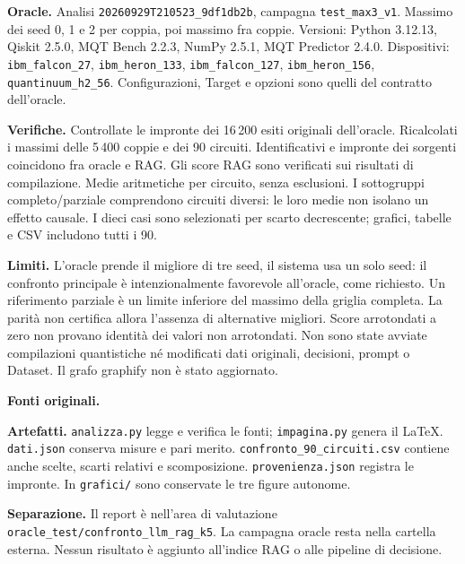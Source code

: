 \documentclass[10pt,a4paper,landscape]{article}
\begin{document}
\textbf{Oracle.} Analisi \texttt{20260929T210523\_9df1db2b}, campagna \texttt{test\_max3\_v1}.
Massimo dei seed 0, 1 e 2 per coppia, poi massimo fra coppie.
Versioni: Python 3.12.13, Qiskit 2.5.0, MQT Bench 2.2.3, NumPy 2.5.1, MQT Predictor 2.4.0.
Dispositivi: \texttt{ibm\_falcon\_27}, \texttt{ibm\_heron\_133}, \texttt{ibm\_falcon\_127},
\texttt{ibm\_heron\_156}, \texttt{quantinuum\_h2\_56}.
Configurazioni, Target e opzioni sono quelli del contratto dell'oracle.

\textbf{Verifiche.}
Controllate le impronte dei 16\,200 esiti originali dell'oracle.
Ricalcolati i massimi delle 5\,400 coppie e dei 90 circuiti.
Identificativi e impronte dei sorgenti coincidono fra oracle e RAG.
Gli score RAG sono verificati sui risultati di compilazione.
Medie aritmetiche per circuito, senza esclusioni.
I sottogruppi completo/parziale comprendono circuiti diversi: le loro medie non isolano un effetto causale.
I dieci casi sono selezionati per scarto decrescente; grafici, tabelle e CSV includono tutti i 90.

\textbf{Limiti.}
L'oracle prende il migliore di tre seed, il sistema usa un solo seed:
il confronto principale è intenzionalmente favorevole all'oracle, come richiesto.
Un riferimento parziale è un limite inferiore del massimo della griglia completa.
La parità non certifica allora l'assenza di alternative migliori.
Score arrotondati a zero non provano identità dei valori non arrotondati.
Non sono state avviate compilazioni quantistiche né modificati dati originali, decisioni, prompt o Dataset.
Il grafo graphify non è stato aggiornato.

\textbf{Fonti originali.}\par
{\footnotesize
{}\par
{}\par
{}\par
}
\textbf{Artefatti.}
\texttt{analizza.py} legge e verifica le fonti; \texttt{impagina.py} genera il LaTeX.
\texttt{dati.json} conserva misure e pari merito.
\texttt{confronto\_90\_circuiti.csv} contiene anche scelte, scarti relativi e scomposizione.
\texttt{provenienza.json} registra le impronte. In \texttt{grafici/} sono conservate le tre figure autonome.

\textbf{Separazione.}
Il report è nell'area di valutazione \texttt{oracle\_test/confronto\_llm\_rag\_k5}.
La campagna oracle resta nella cartella esterna. Nessun risultato è aggiunto all'indice RAG
o alle pipeline di decisione.
\end{document}
